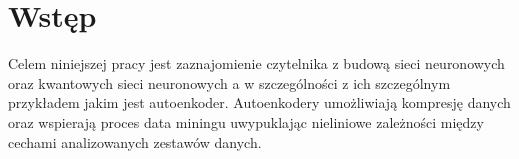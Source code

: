 \section{Wstęp}
Celem niniejszej pracy jest zaznajomienie czytelnika z budową sieci neuronowych oraz kwantowych sieci neuronowych a w szczególności z ich szczególnym przykładem jakim jest autoenkoder. Autoenkodery umożliwiają kompresję danych oraz wspierają proces data miningu uwypuklając nieliniowe zależności między cechami analizowanych zestawów danych.


